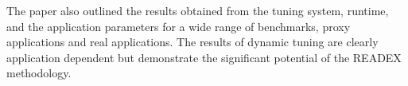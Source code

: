 \documentclass[runningheads]{llncs}
\begin{document}
The paper also outlined the results obtained from the tuning system, runtime, and the application parameters for a wide range of benchmarks, proxy applications and real applications. The results of dynamic tuning are clearly application dependent but demonstrate the significant potential of the READEX methodology.



%
 
 
\end{document}
